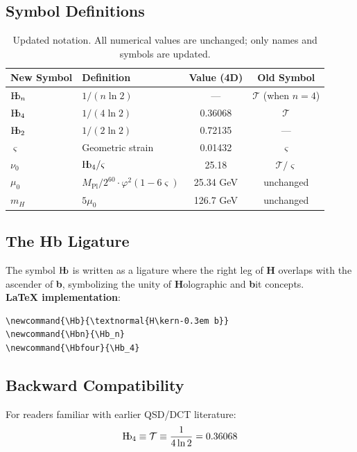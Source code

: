\documentclass[11pt,a4paper]{article}
\theoremstyle{plain}
\theoremstyle{definition}
\newcommand{\Hb}{\textnormal{H\kern-0.3em b}}
\newcommand{\Hbn}{\Hb_n}
\newcommand{\Hbfour}{\Hb_4}
\newcommand{\Hbtwo}{\Hb_2}
\newcommand{\Tc}{\mathcal{T}}
\newcommand{\strain}{\varsigma}
\newcommand{\murad}{\mu_0}
\newcommand{\nurad}{\nu_0}
\newcommand{\Mpl}{M_{\text{Pl}}}
\newcommand{\mH}{m_H}
\begin{document}
\subsection{Symbol Definitions}

\begin{table}[h]
\centering
\begin{tabular}{llcc}
\toprule
\textbf{New Symbol} & \textbf{Definition} & \textbf{Value (4D)} & \textbf{Old Symbol} \\
\midrule
$\Hbn$ & $1/(n\ln 2)$ & --- & $\Tc$ (when $n=4$) \\
$\Hbfour$ & $1/(4\ln 2)$ & 0.36068 & $\Tc$ \\
$\Hbtwo$ & $1/(2\ln 2)$ & 0.72135 & --- \\
\midrule
$\strain$ & Geometric strain & 0.01432 & $\strain$ \\
$\nurad$ & $\Hbfour/\strain$ & 25.18 & $\Tc/\strain$ \\
$\murad$ & $\Mpl/2^{60}\cdot\varphi^2(1-6\strain)$ & 25.34 GeV & unchanged \\
$\mH$ & $5\murad$ & 126.7 GeV & unchanged \\
\bottomrule
\end{tabular}
\caption{Updated notation. All numerical values are unchanged; only names and symbols are updated.}
\label{tab:notation}
\end{table}

\subsection{The Hb Ligature}

The symbol $\Hb$ is written as a ligature where the right leg of \textbf{H} overlaps with the ascender of \textbf{b}, symbolizing the unity of \textbf{H}olographic and \textbf{b}it concepts.\\

\textbf{LaTeX implementation}:
\begin{verbatim}
\newcommand{\Hb}{\textnormal{H\kern-0.3em b}}
\newcommand{\Hbn}{\Hb_n}
\newcommand{\Hbfour}{\Hb_4}
\end{verbatim}

\subsection{Backward Compatibility}

For readers familiar with earlier QSD/DCT literature:
\begin{equation}
\Hbfour \equiv \Tc \equiv \frac{1}{4\ln 2} = 0.36068
\end{equation}
\end{document}
